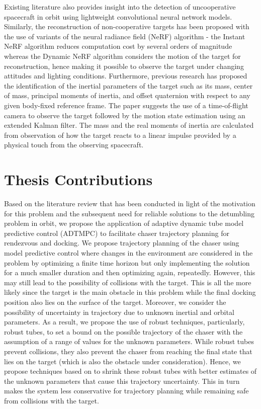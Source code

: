 Existing literature \cite{li2022target} also provides insight into the detection of uncooperative spacecraft in orbit using lightweight convolutional neural network models.
Similarly, the reconstruction of non-cooperative targets has been proposed with the use of variants of the neural radiance field (NeRF) algorithm \cite{caruso20233d} - the Instant NeRF algorithm reduces computation cost by several orders of magnitude whereas the Dynamic NeRF algorithm considers the motion of the target for reconstruction, hence making it possible to observe the target under changing attitudes and lighting conditions.
Furthermore, previous research \cite{meng2019identification} has proposed the identification of the inertial parameters of the target such as its mass, center of mass, principal moments of inertia, and offset quaternion with respect to any given body-fixed reference frame.
The paper suggests the use of a time-of-flight camera to observe the target followed by the motion state estimation using an extended Kalman filter.
The mass and the real moments of inertia are calculated from observation of how the target reacts to a linear impulse provided by a physical touch from the observing spacecraft.

\section{Thesis Contributions}
Based on the literature review that has been conducted in light of the motivation for this problem and the subsequent need for reliable solutions to the detumbling problem in orbit, we propose the application of adaptive dynamic tube model predictive control (ADTMPC) to facilitate chaser trajectory planning for rendezvous and docking.
We propose trajectory planning of the chaser using model predictive control where changes in the environment are considered in the problem by optimizing a finite time horizon but only implementing the solution for a much smaller duration and then optimizing again, repeatedly.
However, this may still lead to the possibility of collisions with the target.
This is all the more likely since the target is the main obstacle in this problem while the final docking position also lies on the surface of the target.
Moreover, we consider the possibility of uncertainty in trajectory due to unknown inertial and orbital parameters.
As a result, we propose the use of robust techniques, particularly, robust tubes, to set a bound on the possible trajectory of the chaser with the assumption of a range of values for the unknown parameters.
While robust tubes prevent collisions, they also prevent the chaser from reaching the final state that lies on the target (which is also the obstacle under consideration).
Hence, we propose techniques based on \cite{morozov2020performance} to shrink these robust tubes with better estimates of the unknown parameters that cause this trajectory uncertainty.
This in turn makes the system less conservative for trajectory planning while remaining safe from collisions with the target.

